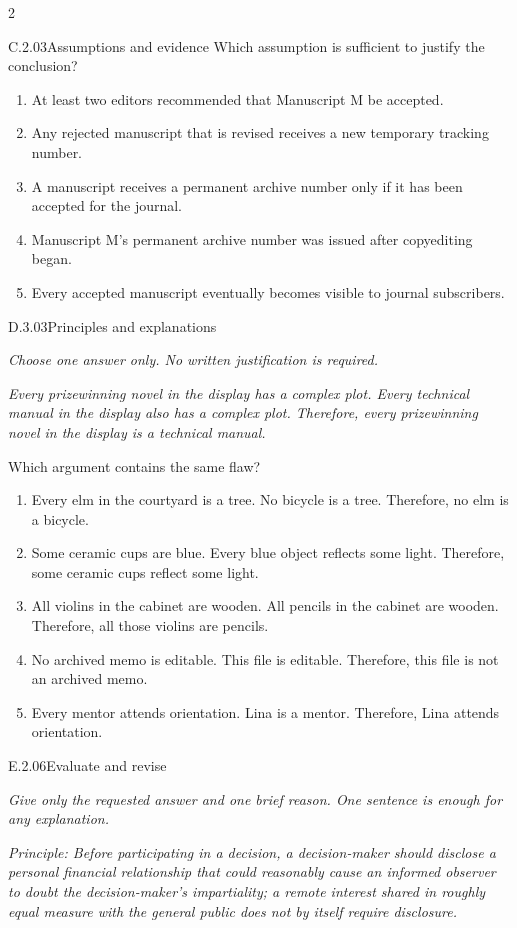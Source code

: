 \documentclass[9pt]{extarticle}
\newcommand{\choice}[1]{\item #1}
\begin{document}
\begin{multicols}{2}
\begin{DenseCoreProblem}{C.2.03}{Assumptions and evidence}
Which assumption is sufficient to justify the conclusion?
\begin{enumerate}[label=(\alph*)]
  \choice{At least two editors recommended that Manuscript M be accepted.}
  \choice{Any rejected manuscript that is revised receives a new temporary tracking number.}
  \choice{A manuscript receives a permanent archive number only if it has been accepted for the journal.}
  \choice{Manuscript M's permanent archive number was issued after copyediting began.}
  \choice{Every accepted manuscript eventually becomes visible to journal subscribers.}
\end{enumerate}
\end{DenseCoreProblem}
\begin{DenseCoreProblem}{D.3.03}{Principles and explanations}
{\scriptsize\textit{Choose one answer only. No written justification is required.}\par}
\emph{Every prizewinning novel in the display has a complex plot. Every technical manual in the display also has a complex plot. Therefore, every prizewinning novel in the display is a technical manual.}

Which argument contains the same flaw?
\begin{enumerate}[label=(\alph*)]
  \choice{Every elm in the courtyard is a tree. No bicycle is a tree. Therefore, no elm is a bicycle.}
  \choice{Some ceramic cups are blue. Every blue object reflects some light. Therefore, some ceramic cups reflect some light.}
  \choice{All violins in the cabinet are wooden. All pencils in the cabinet are wooden. Therefore, all those violins are pencils.}
  \choice{No archived memo is editable. This file is editable. Therefore, this file is not an archived memo.}
  \choice{Every mentor attends orientation. Lina is a mentor. Therefore, Lina attends orientation.}
\end{enumerate}
\end{DenseCoreProblem}
\begin{DenseCoreProblem}{E.2.06}{Evaluate and revise}
{\scriptsize\textit{Give only the requested answer and one brief reason. One sentence is enough for any explanation.}\par}
\emph{Principle: Before participating in a decision, a decision-maker should disclose a personal financial relationship that could reasonably cause an informed observer to doubt the decision-maker's impartiality; a remote interest shared in roughly equal measure with the general public does not by itself require disclosure.}


\end{DenseCoreProblem}
\end{multicols}
\end{document}
